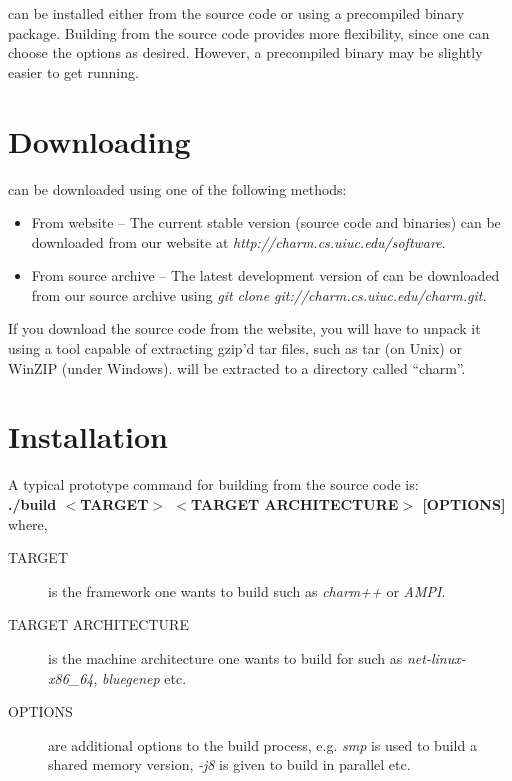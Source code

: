 \charmpp{} can be installed either from the source code or using a precompiled
binary package. Building from the source code provides more flexibility, since one 
can choose the options as desired. However, a precompiled binary may be slightly
easier to get running.
 
\section{Downloading \charmpp{}}

\charmpp{} can be downloaded using one of the following methods:

\begin{itemize}
\item From \charmpp{} website -- The current stable version (source code and
binaries) can be downloaded from our website at {\em http://charm.cs.uiuc.edu/software}.
\item From source archive -- The latest development version of \charmpp{} can be downloaded
from our source archive using {\em git clone git://charm.cs.uiuc.edu/charm.git}.
\end{itemize}

If you download the source code from the website, you will have to unpack it 
using a tool capable of extracting gzip'd tar files, such as tar (on Unix) 
or WinZIP (under Windows).  \charmpp{} will be extracted to a directory 
called ``charm''. 

\section{Installation}

A typical prototype command for building \charmpp{} from the source code is:
\vspace{5pt}\\
{\bf ./build $<$TARGET$>$ $<$TARGET ARCHITECTURE$>$ [OPTIONS]} where,

\begin{description}
\item [TARGET] is the framework one wants to build such as {\em charm++} or {\em
AMPI}.
\item [TARGET ARCHITECTURE] is the machine architecture one wants to build for
such as {\em net-linux-x86\_64}, {\em bluegenep} etc.
\item [OPTIONS] are additional options to the build process, e.g. {\em smp} is
used to build a shared memory version, {\em -j8} is given to build in parallel
etc.
\end {description}

